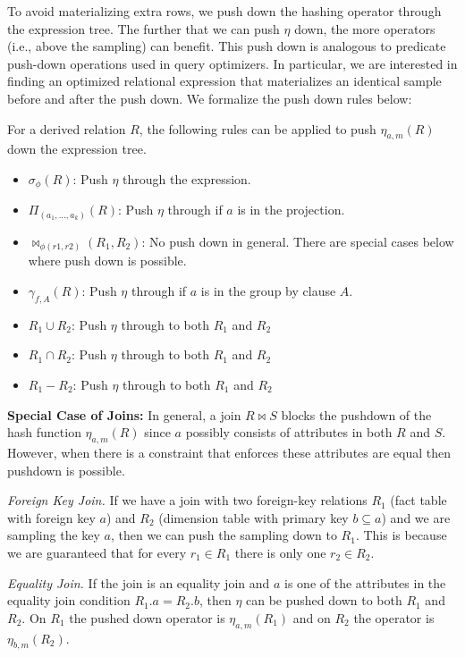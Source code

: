 To avoid materializing extra rows, we push down the hashing operator through the expression tree.
The further that we can push $\eta$ down, the more operators (i.e., above the sampling) can benefit.
This push down is analogous to predicate push-down operations used in query optimizers. 
In particular, we are interested in finding an optimized relational expression that materializes an identical sample before and after the push down.
We formalize the push down rules below:
\begin{definition}
For a derived relation $R$, the following rules can be applied to push $\eta_{a, m}(R)$ down the expression tree. 
\begin{itemize}[noitemsep]
\item $\sigma_{\phi}(R)$: Push $\eta$ through the expression.  
\item $\Pi_{(a_1,...,a_k)}(R)$: Push $\eta $ through if $a$ is in the projection.
\item $\bowtie_{\phi (r1,r2)}(R_1,R_2)$: No push down in general. There are special cases below where push down is possible.
\item $\gamma_{f,A}(R)$: Push $\eta $ through if $a$ is in the group by clause $A$.
\item $R_1 \cup R_2$: Push $\eta $ through to both $R_1$ and $R_2$
\item $R_1 \cap R_2$: Push $\eta $ through to both $R_1$ and $R_2$
\item $R_1 - R_2$: Push $\eta $ through to both $R_1$ and $R_2$
\end{itemize}
\end{definition}

\noindent \textbf{Special Case of Joins: }
In general, a join $R \bowtie S$ blocks the pushdown of the hash function $\eta_{a, m}(R)$ since $a$ possibly consists of attributes in both $R$ and $S$.
However, when there is a constraint that enforces these attributes are equal then pushdown is possible.

\emph{Foreign Key Join. } If we have a join with two foreign-key relations $R_1$ (fact table with foreign key $a$) and $R_2$ (dimension table with primary key $b \subseteq a$) and we are sampling the key $a$, then we can push the sampling down to $R_1$. This is because we are guaranteed that for every $r_1\in R_1$ there is only one $r_2 \in R_2$. 

\emph{Equality Join. } If the join is an equality join and $a$ is one of the attributes in the equality join condition $R_1.a = R_2.b$, then $\eta$ can be pushed down to both $R_1$ and $R_2$. On $R_1$ the pushed down operator is $\eta_{a, m}(R_1)$ and on $R_2$ the operator is $\eta_{b, m}(R_2)$. 

